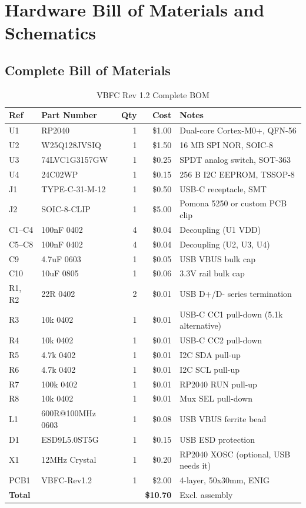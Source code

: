 \appendix
\section{Hardware Bill of Materials and Schematics}
\label{app:hardware}

\subsection{Complete Bill of Materials}
\begin{table}[htbp]
\centering
\caption{VBFC Rev 1.2 Complete BOM}
\label{tab:bom_complete}
\begin{tabular}{@{}llrrp{3.5cm}@{}}
\toprule
\textbf{Ref} & \textbf{Part Number} & \textbf{Qty} & \textbf{Cost} & \textbf{Notes} \\
\midrule
U1 & RP2040 & 1 & \$1.00 & Dual-core Cortex-M0+, QFN-56 \\
U2 & W25Q128JVSIQ & 1 & \$1.50 & 16 MB SPI NOR, SOIC-8 \\
U3 & 74LVC1G3157GW & 1 & \$0.25 & SPDT analog switch, SOT-363 \\
U4 & 24C02WP & 1 & \$0.15 & 256 B I2C EEPROM, TSSOP-8 \\
J1 & TYPE-C-31-M-12 & 1 & \$0.50 & USB-C receptacle, SMT \\
J2 & SOIC-8-CLIP & 1 & \$5.00 & Pomona 5250 or custom PCB clip \\
C1--C4 & 100nF 0402 & 4 & \$0.04 & Decoupling (U1 VDD) \\
C5--C8 & 100nF 0402 & 4 & \$0.04 & Decoupling (U2, U3, U4) \\
C9 & 4.7uF 0603 & 1 & \$0.05 & USB VBUS bulk cap \\
C10 & 10uF 0805 & 1 & \$0.06 & 3.3V rail bulk cap \\
R1, R2 & 22R 0402 & 2 & \$0.01 & USB D+/D- series termination \\
R3 & 10k 0402 & 1 & \$0.01 & USB-C CC1 pull-down (5.1k alternative) \\
R4 & 10k 0402 & 1 & \$0.01 & USB-C CC2 pull-down \\
R5 & 4.7k 0402 & 1 & \$0.01 & I2C SDA pull-up \\
R6 & 4.7k 0402 & 1 & \$0.01 & I2C SCL pull-up \\
R7 & 100k 0402 & 1 & \$0.01 & RP2040 RUN pull-up \\
R8 & 10k 0402 & 1 & \$0.01 & Mux SEL pull-down \\
L1 & 600R@100MHz 0603 & 1 & \$0.08 & USB VBUS ferrite bead \\
D1 & ESD9L5.0ST5G & 1 & \$0.15 & USB ESD protection \\
X1 & 12MHz Crystal & 1 & \$0.20 & RP2040 XOSC (optional, USB needs it) \\
PCB1 & VBFC-Rev1.2 & 1 & \$2.00 & 4-layer, 50x30mm, ENIG \\
\midrule
\textbf{Total} & & & \textbf{\$10.70} & Excl. assembly \\
\bottomrule
\end{tabular}
\end{table}


